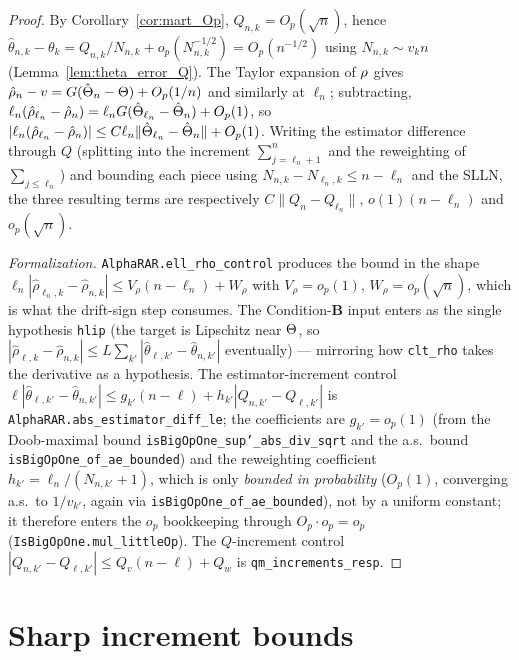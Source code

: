 \begin{proof}\leanok
{}
By Corollary~\ref{cor:mart_Op}, $Q_{n,k}=O_p(\sqrt n)$, hence
$\hat{\theta}_{n,k}-\theta_k = Q_{n,k}/N_{n,k} + o_p(N_{n,k}^{-1/2}) = O_p(n^{-1/2})$
using $N_{n,k}\sim v_k n$ (Lemma~\ref{lem:theta_error_Q}). The Taylor expansion of
$\rho$ gives $\hat{\rho}_n - v = G(\hat{\Theta}_n-\Theta)+O_p(1/n)$ and similarly
at $\ell_n$; subtracting,
$\ell_n(\hat{\rho}_{\ell_n}-\hat{\rho}_n)
 = \ell_n G(\hat{\Theta}_{\ell_n}-\hat{\Theta}_n) + O_p(1)$, so
$|\ell_n(\hat{\rho}_{\ell_n}-\hat{\rho}_n)| \le C\ell_n\|\hat{\Theta}_{\ell_n}-\hat{\Theta}_n\| + O_p(1)$.
Writing the estimator difference through $Q$ (splitting into the increment
$\sum_{j=\ell_n+1}^n$ and the reweighting of $\sum_{j\le\ell_n}$) and bounding
each piece using $N_{n,k}-N_{\ell_n,k}\le n-\ell_n$ and the SLLN, the three
resulting terms are respectively $C\|Q_n-Q_{\ell_n}\|$, $o(1)(n-\ell_n)$ and
$o_p(\sqrt n)$.

\emph{Formalization.} \texttt{AlphaRAR.ell\_rho\_control} produces the bound in the shape
$\ell_n|\hat\rho_{\ell_n,k}-\hat\rho_{n,k}| \le V_\rho(n-\ell_n)+W_\rho$ with $V_\rho=o_p(1)$,
$W_\rho=o_p(\sqrt n)$, which is what the drift-sign step consumes. The Condition-\textbf{B} input
enters as the single hypothesis \texttt{hlip} (the target is Lipschitz near $\Theta$, so
$|\hat\rho_{\ell,k}-\hat\rho_{n,k}|\le L\sum_{k'}|\hat\theta_{\ell,k'}-\hat\theta_{n,k'}|$
eventually) --- mirroring how \texttt{clt\_rho} takes the derivative as a hypothesis. The
estimator-increment control $\ell|\hat\theta_{\ell,k'}-\hat\theta_{n,k'}|\le g_{k'}(n-\ell)+h_{k'}
|Q_{n,k'}-Q_{\ell,k'}|$ is \texttt{AlphaRAR.abs\_estimator\_diff\_le}; the coefficients are
$g_{k'}=o_p(1)$ (from the Doob-maximal bound \texttt{isBigOpOne\_sup'\_abs\_div\_sqrt} and the a.s.\
bound \texttt{isBigOpOne\_of\_ae\_bounded}) and the reweighting coefficient
$h_{k'}=\ell_n/(N_{n,k'}+1)$, which is only \emph{bounded in probability} ($O_p(1)$, converging a.s.\
to $1/v_{k'}$, again via \texttt{isBigOpOne\_of\_ae\_bounded}), not by a uniform constant; it
therefore enters the $o_p$ bookkeeping through $O_p\cdot o_p=o_p$
(\texttt{IsBigOpOne.mul\_littleOp}). The $Q$-increment control
$|Q_{n,k'}-Q_{\ell,k'}|\le Q_v(n-\ell)+Q_w$ is \texttt{qm\_increments\_resp}.
\end{proof}

\section{Sharp increment bounds}
\label{sec:norm_bounds}

